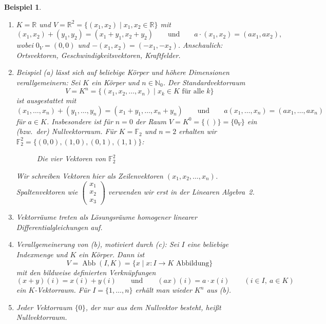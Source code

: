 \documentclass[a4paper]{article}
\theoremstyle{kurzskript}
\newtheorem{beispiel}[satz]{Beispiel}
\newcommand{\N}{\mathbb{N}}
\newcommand{\R}{\mathbb{R}}
\begin{document}
\begin{beispiel}\label{bsp:vektorraeume}
\leavevmode
\begin{enumerate}[label=(\alph*)]
  \item $K = \R$ und $V = \R^2 = \{(x_1, x_2) \mid x_1, x_2 \in \R\}$ mit
  \[
    (x_1, x_2) + (y_1, y_2) = (x_1 + y_1, x_2 + y_2) \qquad\text{und}\qquad a \cdot (x_1, x_2) = (a x_1, a x_2),
  \]
  wobei $0_V = (0, 0)$ und $-(x_1, x_2) = (-x_1, -x_2)$. Anschaulich: Ortsvektoren, Geschwindigkeitsvektoren, Kraftfelder.
  \item Beispiel (a) lässt sich auf beliebige Körper und höhere Dimensionen verallgemeinern: Sei $K$ ein Körper und $n \in \N_0$. Der \emph{Standardvektorraum}
  \[
    V = K^n = \{(x_1, x_2, \dots, x_n) \mid x_k \in K \text{ für alle } k\}
  \]
  ist ausgestattet mit
  \[
    (x_1, \dots, x_n) + (y_1, \dots, y_n) = (x_1 + y_1, \dots, x_n + y_n) \qquad\text{und}\qquad a (x_1, \dots, x_n) = (a x_1, \dots, a x_n)
  \]
  für $a \in K$. Insbesondere ist für $n = 0$ der Raum $V = K^0 = \{()\} = \{0_V\}$ ein (bzw.\ \emph{der}) Nullvektorraum. Für $K = \mathbb{F}_2$ und $n = 2$ erhalten wir $\mathbb{F}_2^2 = \{(0, 0), (1, 0), (0, 1), (1, 1)\}$:
  \begin{figure}[H]
  \centering
  \caption{Die vier Vektoren von $\mathbb{F}_2^2$}
  \end{figure}
  Wir schreiben Vektoren hier als \emph{Zeilenvektoren} $(x_1, x_2, \dots, x_n)$. \emph{Spaltenvektoren} wie $\left(\begin{smallmatrix} x_1 \\ x_2 \\ x_3 \end{smallmatrix}\right)$ verwenden wir erst in der Linearen Algebra~2.
  \item Vektorräume treten als Lösungsräume homogener linearer Differentialgleichungen auf.
  \item Verallgemeinerung von (b), motiviert durch (c): Sei $I$ eine beliebige Indexmenge und $K$ ein Körper. Dann ist
  \[
    V = \operatorname{Abb}(I, K) = \{x \mid x\colon I \to K \text{ Abbildung}\}
  \]
  mit den bildweise definierten Verknüpfungen
  \[
    (x + y)(i) = x(i) + y(i) \qquad\text{und}\qquad (a x)(i) = a \cdot x(i) \qquad (i \in I,\ a \in K)
  \]
  ein $K$-Vektorraum. Für $I = \{1, \dots, n\}$ erhält man wieder $K^n$ aus (b).
  \item Jeder Vektorraum $\{0\}$, der nur aus dem Nullvektor besteht, heißt \emph{Nullvektorraum}.
\end{enumerate}
\end{beispiel}
\end{document}
